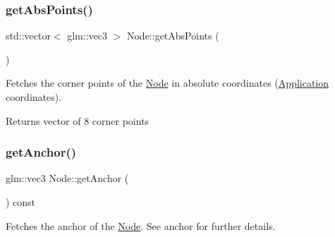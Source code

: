 \mbox{\label{classsage_1_1Node_a59ed0e3a59713eef867f9e4948dcddcf}} 
\subsubsection{\texorpdfstring{getAbsPoints()}{getAbsPoints()}}
{\footnotesize\ttfamily std\+::vector$<$ glm\+::vec3 $>$ Node\+::get\+Abs\+Points (\begin{DoxyParamCaption}{ }\end{DoxyParamCaption})}



Fetches the corner points of the \mbox{\hyperlink{classsage_1_1Node}{Node}} in absolute coordinates (\mbox{\hyperlink{classsage_1_1Application}{Application}} coordinates). 

\begin{DoxyReturn}{Returns}
vector of 8 corner points 
\end{DoxyReturn}
\mbox{\label{classsage_1_1Node_a1314e39981d8adee8a75c96f29c9e181}} 
\subsubsection{\texorpdfstring{getAnchor()}{getAnchor()}}
{\footnotesize\ttfamily glm\+::vec3 Node\+::get\+Anchor (\begin{DoxyParamCaption}{ }\end{DoxyParamCaption}) const}



Fetches the anchor of the \mbox{\hyperlink{classsage_1_1Node}{Node}}. See anchor for further details. 

